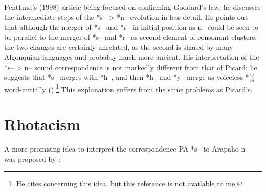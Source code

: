 \documentclass[oldfontcommands,oneside,a4paper,11pt]{article}
\begin{document}
 
Pentland's (1998) article being focused on confirming Goddard's law, he discusses the intermediate steps of the *s-- > *n-- evolution in less detail. He points out that although the merger of *s-- and *r-- in initial position as n-- could be seen to be parallel to the merger of *s-- and *r-- as second element of consonant clusters, the two changes are certainly unrelated, as the second is shared by many Algonquian languages and probably much more ancient. His interpretation of the *s-- > n-- sound correspondence is not markedly different from that of Picard: he suggests that *s-- merges with *h--, and then *h-- and *y-- merge as voiceless *[j̥] word-initially (\citealt[318]{pentland98}).\footnote{He cites \citet[354]{pentland79phd} concerning this idea, but this reference is not available to me.} This explanation suffers from the same problems as Picard's.


 

\section{Rhotacism}
A more promising idea to interpret the correspondence PA *s-- to Arapaho n-- was proposed by \citet[76]{goddard01plains}:
\end{document}
